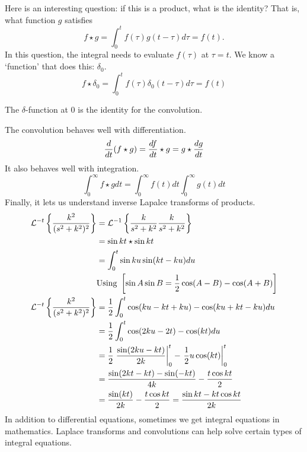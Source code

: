 \documentclass[fleqn,letterpaper]{report}
\begin{document}
Here is an interesting question: if this is a product, what is the
identity? That is, what function $g$ satisfies
\begin{equation*}
f \star g = \int_0^t f(\tau) g(t-\tau) d \tau = f(t).
\end{equation*}
In this question, the integral needs to evaluate $f(\tau)$
at $\tau = t$. We know a `function' that does this:
$\delta_0$. 
\begin{equation*}
f \star \delta_0 = \int_0^t f(\tau) \delta_0 (t-\tau) d \tau =
f(t) 
\end{equation*}

\begin{prop}
The $\delta$-function at 0 is the identity for the convolution. 
\end{prop}

The convolution behaves well with differentiation.
\begin{equation*}
\frac{d}{dt} (f \star g) = \frac{df}{dt} \star g = g \star
\frac{dg}{dt} \\
\end{equation*}
It also behaves well with integration.
\begin{equation*}
\int_0^\infty f \star g dt = \int_0^\infty f(t) dt \int_0^\infty
g(t) dt 
\end{equation*}
Finally, it lets us understand inverse Lapalce transforms of
products.
\begin{align*}
\mathcal{L}^{-t} \left\{ \frac{k^2}{(s^2+k^2)^2} \right\} & = \mathcal{L}^{-1}
\left\{ \frac{k}{s^2+k^2} \frac{k}{s^2+k^2} \right\} \\
& = \sin kt \star \sin kt \\
& = \int_0^t \sin ku \sin (kt-ku) du \\
& \text{Using } \left[ \sin A \sin B = \frac{1}{2} \cos (A-B) - \cos (A+B) \right] \\
\mathcal{L}^{-t} \left\{ \frac{k^2}{(s^2+k^2)^2} \right\} 
& = \frac{1}{2} \int_0^t \cos (ku - kt + ku) - \cos (ku + kt -
ku ) du \\
& = \frac{1}{2} \int_0^t \cos (2ku - 2t) - \cos (kt) du \\
& = \frac{1}{2} \left. \frac{\sin (2ku - kt)}{2k} \right|_0^t -
\left. \frac{1}{2} u \cos (kt) \right|_0^t \\
& = \frac{\sin (2kt-kt) - \sin (-kt)}{4k} - \frac{t\cos kt}{2}
\\
& = \frac{\sin (kt)}{2k} - \frac{t\cos kt}{2} = \frac{\sin kt -
kt \cos kt}{2k} 
\end{align*} 
In addition to differential equations, sometimes we get
integral equations in mathematics. Laplace transforms and
convolutions can help solve certain types of integral
equations.
\end{document}
